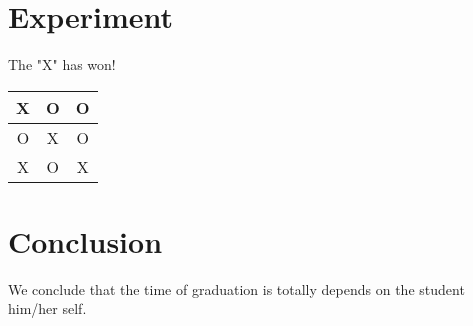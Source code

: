 \documentclass[12pt,a4paper]{report}
\begin{document}
\begin{CJK}{UTF8}{bsmi}
\chapter{Experiment}
The "X" has won!
    \begin{center}
        \begin{tabular}{ |c|c|c| } 
             \hline
             X & O & O \\ 
              \hline
             O & X & O \\ 
              \hline
             X & O & X \\ 
             \hline
        \end{tabular}
        \label{table:tic_tac_toe}
    \end{center}
 





\chapter{Conclusion}
    We conclude that the time of graduation is totally depends on the student him/her self. 

\end{CJK}



\end{document}
